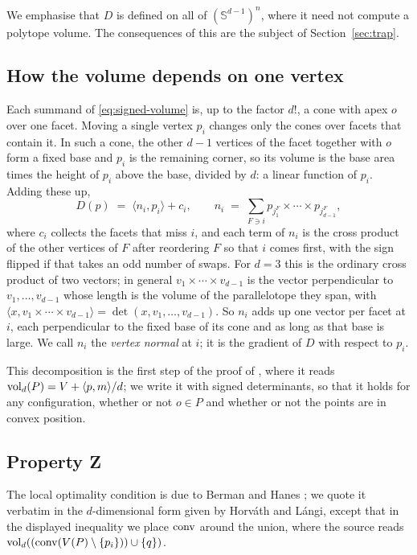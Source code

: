 We emphasise that $D$ is defined on all of $(\mathbb{S}^{d-1})^{n}$, where it
need not compute a polytope volume. The consequences of this are the subject of
Section~\ref{sec:trap}.

\subsection{How the volume depends on one vertex}

Each summand of \eqref{eq:signed-volume} is, up to the factor $d!$, a cone
with apex $o$ over one facet. Moving a single vertex $p_{i}$ changes only the
cones over facets that contain it. In such a cone, the other $d-1$ vertices of
the facet together with $o$ form a fixed base and $p_{i}$ is the remaining
corner, so its volume is the base area times the height of $p_{i}$ above the
base, divided by $d$: a linear function of $p_{i}$. Adding these up,
\begin{equation}
  \label{eq:multilinear}
  D(p) \;=\; \langle n_{i}, p_{i}\rangle + c_{i},
  \qquad
  n_{i} \;=\; \sum_{F \ni i} p_{j_{1}^{F}} \times \cdots \times p_{j_{d-1}^{F}},
\end{equation}
where $c_{i}$ collects the facets that miss $i$, and each term of $n_{i}$ is the
cross product of the other vertices of $F$ after reordering $F$ so that $i$
comes first, with the sign flipped if that takes an odd number of swaps. For $d = 3$ this is the ordinary cross product of two
vectors; in general $v_{1} \times \cdots \times v_{d-1}$ is the vector
perpendicular to $v_{1},\dots,v_{d-1}$ whose length is the volume of the
parallelotope they span, with $\langle x, v_{1} \times \cdots \times
v_{d-1}\rangle = \det(x, v_{1},\dots,v_{d-1})$. So $n_{i}$ adds up one vector
per facet at $i$, each perpendicular to the fixed base of its cone and as long
as that base is large. We call $n_{i}$ the \emph{vertex normal} at $i$; it is
the gradient of $D$ with respect to $p_{i}$.

This decomposition is the first step of the proof of
\cite[Lemma~1]{horvath-langi-2016}, where it reads
$\operatorname{vol}_{d}(P) = V + \langle p, m\rangle/d$; we write it with signed
determinants, so that it holds for any configuration, whether or not
$o \in P$ and whether or not the points are in convex position.

\subsection{Property Z}

The local optimality condition is due to Berman and Hanes
\cite{berman-hanes-1970}; we quote it verbatim in the $d$-dimensional form
given by Horv\'{a}th and L\'{a}ngi, except that in the displayed inequality we
place $\operatorname{conv}$ around the union, where the source reads
$\operatorname{vol}_{d}((\operatorname{conv}(V(P)\setminus\{p_{i}\}))\cup\{q\})$.

